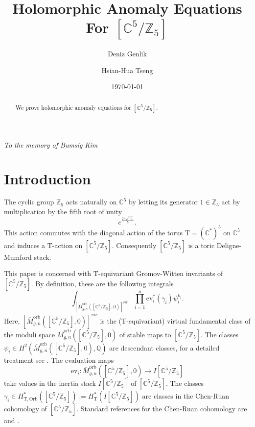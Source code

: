 \documentclass[12pt]{amsart}
\title{Holomorphic Anomaly Equations For $[\mathbb{C}^5/\mathbb{Z}_5]$}
\author[Genlik]{Deniz Genlik}
\author[Tseng]{Hsian-Hua Tseng}
\numberwithin{equation}{section}
\begin{document}
\begin{abstract}
We prove holomorphic anomaly equations for $[\mathbb{C}^5/\mathbb{Z}_5]$.
\end{abstract}

\date{\today}


\maketitle

{\centering \em To the memory of Bumsig Kim\par}


\tableofcontents

\setcounter{section}{-1}

\section{Introduction}

The cyclic group $\mathbb{Z}_5$ acts naturally on $\mathbb{C}^5$ by letting its generator $1\in\mathbb{Z}_5$ act by multiplication by the fifth root of unity $$e^{\frac{2\pi\sqrt{-1}}{5}}.$$
This action commutes with the diagonal action of the torus $\mathrm{T}=(\mathbb{C}^*)^5$ on $\mathbb{C}^5$ and induces a $\mathrm{T}$-action on $[\mathbb{C}^5/\mathbb{Z}_5]$. Consequently $[\mathbb{C}^5/\mathbb{Z}_5]$ is a toric Deligne-Mumford stack.

This paper is concerned with $\mathrm{T}$-equivariant Gromov-Witten invariants of $[\mathbb{C}^5/\mathbb{Z}_5]$. By definition, these are the following integrals
\begin{equation}\label{eqn:GWinv}
    \int_{\left[\overline{M}_{g, n}^{\mathrm{orb}}\left(\left[\mathbb{C}^{5} / \mathbb{Z}_{5}\right], 0\right)\right]^{vir}} \prod_{i=1}^{n} \mathrm{ev}_{i}^{*}\left(\gamma_{i}\right)\psi_i^{k_i}. 
\end{equation}
Here, $ [\overline{M}_{g, n}^{\mathrm{orb}}\left(\left[\mathbb{C}^{5} / \mathbb{Z}_{5}\right], 0\right)]^{vir}$ is the ($\mathrm{T}$-equivariant) virtual fundamental class of the moduli space $\overline{M}_{g, n}^{\mathrm{orb}}\left(\left[\mathbb{C}^{5} / \mathbb{Z}_{5}\right], 0\right)$ of stable maps to $[\mathbb{C}^5/\mathbb{Z}_5]$. The classes $\psi_i\in H^2(\overline{M}_{g, n}^{\mathrm{orb}}\left(\left[\mathbb{C}^{5} / \mathbb{Z}_{5}\right], 0\right), \mathbb{Q})$ are descendant classes, for a detailed treatment see \cite{k}.  The evaluation maps
\begin{equation*}
  \mathrm{ev}_i: \overline{M}_{g, n}^{\mathrm{orb}}\left(\left[\mathbb{C}^{5} / \mathbb{Z}_{5}\right], 0\right)\to I[\mathbb{C}^5/\mathbb{Z}_5]  
\end{equation*}
 take values in the inertia stack $I[\mathbb{C}^5/\mathbb{Z}_5]$ of $[\mathbb{C}^5/\mathbb{Z}_5]$. The classes $\gamma_i\in H^*_\mathrm{T, Orb}([\mathbb{C}^5/\mathbb{Z}_5]):=H^*_\mathrm{T}(I[\mathbb{C}^5/\mathbb{Z}_5])$ are classes in the Chen-Ruan cohomology of $[\mathbb{C}^5/\mathbb{Z}_5]$. Standard references for the Chen-Ruan cohomology are \cite{alr} and \cite{cr}.
\end{document}
